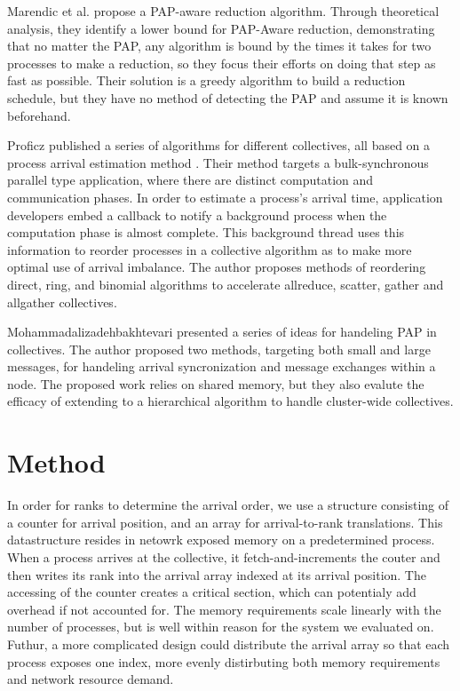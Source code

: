 Marendic et al. \cite{Marendic2016Clairvoyant} propose a PAP-aware reduction algorithm.
Through theoretical analysis, they identify a lower bound for PAP-Aware reduction, demonstrating that no matter the PAP, any algorithm is bound by the times it takes for two processes to make a reduction, so they focus their efforts on doing that step as fast as possible. 
Their solution is a greedy algorithm to build a reduction schedule, but they have no method of detecting the PAP and assume it is known beforehand.

Proficz published a series of algorithms for different collectives, all based on a process arrival estimation method \cite{Proficz2018ImprvAllReduceForImbPAP, Proficz2020PAPAwareScatterGather, Proficz2021AllGatherResilientToImbPAP}.
Their method targets a bulk-synchronous parallel type application, where there are distinct computation and communication phases.
In order to estimate a process's arrival time, application developers embed a callback to notify a background process when the computation phase is almost complete.
This background thread uses this information to reorder processes in a collective algorithm as to make more optimal use of arrival imbalance.
The author proposes methods of reordering direct, ring, and binomial algorithms to accelerate allreduce, scatter, gather and allgather collectives.

Mohammadalizadehbakhtevari \cite{Mohammadalizadehbakhtevari2021Thesis} presented a series of ideas for handeling PAP in collectives. 
The author proposed two methods, targeting both small and large messages, for handeling arrival syncronization and message exchanges within a node.
The proposed work relies on shared memory, but they also evalute the efficacy of extending to a hierarchical algorithm to handle cluster-wide collectives.

\section{Method}
In order for ranks to determine the arrival order, we use a structure consisting of a counter for arrival position, and an array for arrival-to-rank translations.
This datastructure resides in netowrk exposed memory on a predetermined process.
When a process arrives at the collective, it fetch-and-increments the couter and then writes its rank into the arrival array indexed at its arrival position.
The accessing of the counter creates a critical section, which can potentialy add overhead if not accounted for.
The memory requirements scale linearly with the number of processes, but is well within reason for the system we evaluated on.
Futhur, a more complicated design could distribute the arrival array so that each process exposes one index, more evenly distirbuting both memory requirements and network resource demand.

